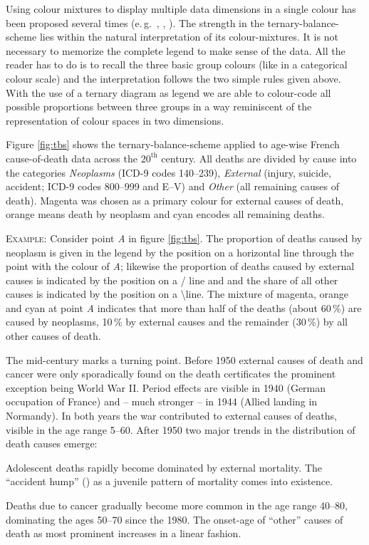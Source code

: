 \documentclass[a4paper, 12pt]{scrartcl}
\begin{document}
Using colour mixtures to display multiple data dimensions in a single colour has been proposed several times (e.\,g.~\cite{Trumbo1981}, \cite{Eyton1984}, \cite{Ware1988}). The strength in the ternary-balance-scheme lies within the natural interpretation of its colour-mixtures. It is not necessary to memorize the complete legend to make sense of the data. All the reader has to do is to recall the three basic group colours (like in a categorical colour scale) and the interpretation follows the two simple rules given above. With the use of a ternary diagram as legend we are able to colour-code all possible proportions between three groups in a way reminiscent of the representation of colour spaces in two dimensions.

Figure \ref{fig:tbs} shows the ternary-balance-scheme applied to age-wise French cause-of-death data across the $20^\text{th}$ century. All deaths are divided by cause into the categories \emph{Neoplasms} (ICD-9 codes 140--239), \emph{External} (injury, suicide, accident; ICD-9 codes 800--999 and E--V) and \emph{Other} (all remaining causes of death). Magenta was chosen as a primary colour for external causes of death, orange means death by neoplasm and cyan encodes all remaining deaths.

\textsc{Example:} Consider point \emph{A} in figure \ref{fig:tbs}. The proportion of deaths caused by neoplasm is given in the legend by the position on a horizontal line through the point with the colour of \emph{A}; likewise the proportion of deaths caused by external causes is indicated by the position on a / line and and the share of all other causes is indicated by the position on a \textbackslash line. The mixture of magenta, orange and cyan at point \emph{A} indicates that more than half of the deaths (about 60\,\%) are caused by neoplasms, 10\,\% by external causes and the remainder (30\,\%) by all other causes of death.

The mid-century marks a turning point. Before 1950 external causes of death and cancer were only sporadically found on the death certificates the prominent exception being World War II. Period effects are visible in 1940 (German occupation of France) and -- much stronger -- in 1944 (Allied landing in Normandy). In both years the war contributed to external causes of deaths, visible in the age range 5--60. After 1950 two major trends in the distribution of death causes emerge:
\begin{inparaenum}
  \item Adolescent deaths rapidly become dominated by external mortality. The \enquote{accident hump} (\cite{Heligman1980}) as a juvenile pattern of mortality comes into existence.
  \item Deaths due to cancer gradually become more common in the age range 40--80, dominating the ages 50--70 since the 1980. The onset-age of \enquote{other} causes of death as most prominent increases in a linear fashion.
\end{inparaenum}
\end{document}
